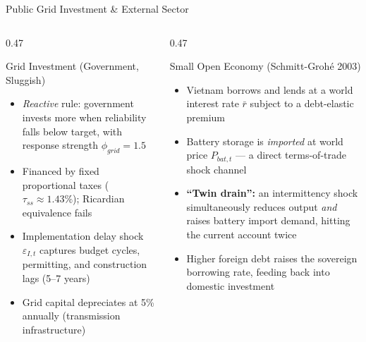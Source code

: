 \documentclass[aspectratio=169,10pt]{beamer}
\newcommand{\fuvwarn}[1]{\textcolor{fuvred}{\textbf{#1}}}
\begin{document}
\begin{frame}{Public Grid Investment \& External Sector}
	\begin{columns}[T]
		\begin{column}{0.47\textwidth}
			\begin{block}{Grid Investment (Government, Sluggish)}
				\begin{itemize}\small
					\item \textit{Reactive} rule: government invests more when reliability falls below target, with response strength $\phi_{grid} = 1.5$
					\item Financed by fixed proportional taxes ($\tau_{ss} \approx 1.43\%$); Ricardian equivalence fails
					\item Implementation delay shock $\varepsilon_{I,t}$ captures budget cycles, permitting, and construction lags (5--7 years)
					\item Grid capital depreciates at 5\% annually (transmission infrastructure)
				\end{itemize}
			\end{block}
		\end{column}
		\begin{column}{0.47\textwidth}
			\begin{block}{Small Open Economy (Schmitt-Grohé 2003)}
				\begin{itemize}\small
					\item Vietnam borrows and lends at a world interest rate $\bar{r}$ subject to a debt-elastic premium
					\item Battery storage is \textit{imported} at world price $P_{bat,t}$ --- a direct terms-of-trade shock channel
					\item \fuvwarn{``Twin drain'':} an intermittency shock simultaneously reduces output \textit{and} raises battery import demand, hitting the current account twice
					\item Higher foreign debt raises the sovereign borrowing rate, feeding back into domestic investment
				\end{itemize}
			\end{block}
		\end{column}
	\end{columns}
\end{frame}
\end{document}
